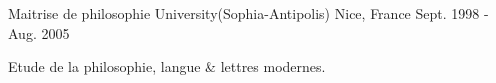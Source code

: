 

\begin{cventries}

  \cventry
    {Maitrise de philosophie} %
    {University(Sophia-Antipolis)} %
    {Nice, France} %
    {Sept. 1998 - Aug. 2005} %
    {
      \begin{cvitems} %
        \item {Etude de la philosophie, langue \& lettres modernes.}
      \end{cvitems}
    }

\end{cventries}
